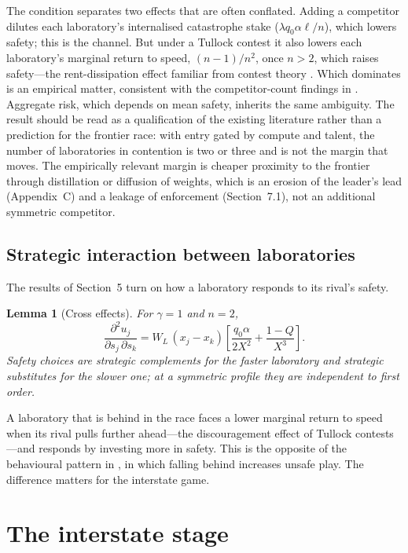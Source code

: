 \documentclass[11pt]{article}
\theoremstyle{plain}
\newtheorem{lemma}{Lemma}
\theoremstyle{definition}
\theoremstyle{remark}
\newcommand{\WL}{W_{\!L}}
\begin{document}
The condition separates two effects that are often conflated. Adding a competitor dilutes each laboratory's internalised catastrophe stake ($\lambda q_0\alpha\ell/n$), which lowers safety; this is the \citet{armstrong2016} channel. But under a Tullock contest it also lowers each laboratory's marginal return to speed, $(n-1)/n^2$, once $n>2$, which raises safety---the rent-dissipation effect familiar from contest theory \citep{tullock1980}. Which dominates is an empirical matter, consistent with the competitor-count findings in \citet{polborn2025}. Aggregate risk, which depends on mean safety, inherits the same ambiguity. The result should be read as a qualification of the existing literature rather than a prediction for the frontier race: with entry gated by compute and talent, the number of laboratories in contention is two or three and is not the margin that moves. The empirically relevant margin is cheaper proximity to the frontier through distillation or diffusion of weights, which is an erosion of the leader's lead (Appendix~C) and a leakage of enforcement (Section~7.1), not an additional symmetric competitor.

\subsection{Strategic interaction between laboratories}

The results of Section~5 turn on how a laboratory responds to its rival's safety.

\begin{lemma}[Cross effects]
For $\gamma=1$ and $n=2$,
\begin{equation}
\frac{\partial^2 u_j}{\partial s_j\,\partial s_k}=\WL\,(x_j-x_k)\left[\frac{q_0\alpha}{2X^2}+\frac{1-Q}{X^3}\right].
\label{eq:cross}
\end{equation}
Safety choices are strategic complements for the faster laboratory and strategic substitutes for the slower one; at a symmetric profile they are independent to first order.
\end{lemma}

A laboratory that is behind in the race faces a lower marginal return to speed when its rival pulls further ahead---the discouragement effect of Tullock contests---and responds by investing more in safety. This is the opposite of the behavioural pattern in \citet{fernandez2026}, in which falling behind increases unsafe play. The difference matters for the interstate game.

\section{The interstate stage}
\end{document}

